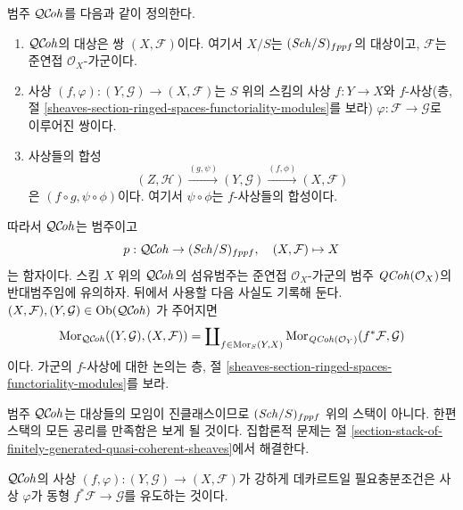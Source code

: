 \noindent
범주 $\mathcal{QC}\!\mathit{oh}$를 다음과 같이 정의한다.
\begin{enumerate}
\item $\mathcal{QC}\!\mathit{oh}$의 대상은 쌍 $(X, \mathcal{F})$이다. 여기서 $X/S$는
$(\mathit{Sch}/S)_{fppf}$의 대상이고, $\mathcal{F}$는 준연접
$\mathcal{O}_X$-가군이다.
\item 사상 $(f, \varphi) : (Y, \mathcal{G}) \to (X, \mathcal{F})$는
$S$ 위의 스킴의 사상 $f : Y \to X$와 $f$-사상(층, 절
\ref{sheaves-section-ringed-spaces-functoriality-modules}를 보라)
$\varphi : \mathcal{F} \to \mathcal{G}$로 이루어진 쌍이다.
\item 사상들의 합성
$$
(Z, \mathcal{H}) \xrightarrow{(g, \psi)}
(Y, \mathcal{G}) \xrightarrow{(f, \phi)} (X, \mathcal{F})
$$
은 $(f \circ g, \psi \circ \phi)$이다. 여기서 $\psi \circ \phi$는
$f$-사상들의 합성이다.
\end{enumerate}
따라서 $\mathcal{QC}\!\mathit{oh}$는 범주이고
$$
p : \mathcal{QC}\!\mathit{oh} \to (\mathit{Sch}/S)_{fppf},
\quad
(X, \mathcal{F}) \mapsto X
$$
는 함자이다. 스킴 $X$ 위의 $\mathcal{QC}\!\mathit{oh}$의 섬유범주는 준연접
$\mathcal{O}_X$-가군의 범주 $\mathit{QCoh}(\mathcal{O}_X)$의 반대범주임에
유의하자. 뒤에서 사용할 다음 사실도 기록해 둔다.
$(X, \mathcal{F}), (Y, \mathcal{G}) \in \mathop{\mathrm{Ob}}\nolimits(\mathcal{QC}\!\mathit{oh})$
가 주어지면
\begin{equation}
\label{equation-morphisms-qcoh}
\mathop{\mathrm{Mor}}\nolimits_{\mathcal{QC}\!\mathit{oh}}((Y, \mathcal{G}), (X, \mathcal{F}))
=
\coprod\nolimits_{f \in \mathop{\mathrm{Mor}}\nolimits_S(Y, X)}
\mathop{\mathrm{Mor}}\nolimits_{\mathit{QCoh}(\mathcal{O}_Y)}(f^*\mathcal{F}, \mathcal{G})
\end{equation}
이다. 가군의 $f$-사상에 대한 논의는 층, 절
\ref{sheaves-section-ringed-spaces-functoriality-modules}를 보라.

\medskip\noindent
범주 $\mathcal{QC}\!\mathit{oh}$는 대상들의 모임이 진클래스이므로
$(\mathit{Sch}/S)_{fppf}$ 위의 스택이 아니다. 한편 스택의 모든 공리를 만족함은
보게 될 것이다. 집합론적 문제는 절
\ref{section-stack-of-finitely-generated-quasi-coherent-sheaves}에서
해결한다.

\begin{lemma}
\label{lemma-quasi-coherent-strongly-cartesian}
$\mathcal{QC}\!\mathit{oh}$의 사상
$(f, \varphi) : (Y, \mathcal{G}) \to (X, \mathcal{F})$가 강하게
데카르트일 필요충분조건은 사상 $\varphi$가 동형
$f^*\mathcal{F} \to \mathcal{G}$를 유도하는 것이다.
\end{lemma}

